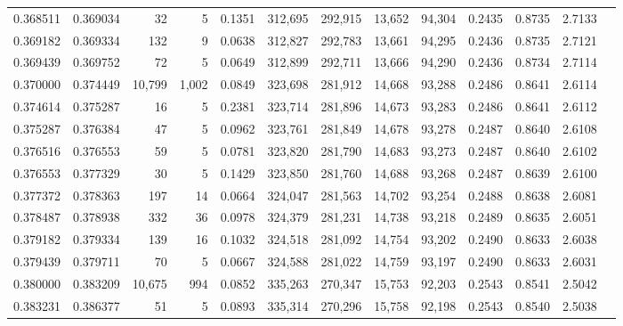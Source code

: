 \begin{tabular}{rrrrrrrrrrrrr}
0.368511 & 0.369034 &     32 &     5 &                                     0.1351 & 312,695 & 292,915 &  13,652 &  94,304 & 0.2435 & 0.8735 & 2.7133 \\
0.369182 & 0.369334 &    132 &     9 &                                     0.0638 & 312,827 & 292,783 &  13,661 &  94,295 & 0.2436 & 0.8735 & 2.7121 \\
0.369439 & 0.369752 &     72 &     5 &                                     0.0649 & 312,899 & 292,711 &  13,666 &  94,290 & 0.2436 & 0.8734 & 2.7114 \\
0.370000 & 0.374449 & 10,799 & 1,002 &                                     0.0849 & 323,698 & 281,912 &  14,668 &  93,288 & 0.2486 & 0.8641 & 2.6114 \\
0.374614 & 0.375287 &     16 &     5 &                                     0.2381 & 323,714 & 281,896 &  14,673 &  93,283 & 0.2486 & 0.8641 & 2.6112 \\
0.375287 & 0.376384 &     47 &     5 &                                     0.0962 & 323,761 & 281,849 &  14,678 &  93,278 & 0.2487 & 0.8640 & 2.6108 \\
0.376516 & 0.376553 &     59 &     5 &                                     0.0781 & 323,820 & 281,790 &  14,683 &  93,273 & 0.2487 & 0.8640 & 2.6102 \\
0.376553 & 0.377329 &     30 &     5 &                                     0.1429 & 323,850 & 281,760 &  14,688 &  93,268 & 0.2487 & 0.8639 & 2.6100 \\
0.377372 & 0.378363 &    197 &    14 &                                     0.0664 & 324,047 & 281,563 &  14,702 &  93,254 & 0.2488 & 0.8638 & 2.6081 \\
0.378487 & 0.378938 &    332 &    36 &                                     0.0978 & 324,379 & 281,231 &  14,738 &  93,218 & 0.2489 & 0.8635 & 2.6051 \\
0.379182 & 0.379334 &    139 &    16 &                                     0.1032 & 324,518 & 281,092 &  14,754 &  93,202 & 0.2490 & 0.8633 & 2.6038 \\
0.379439 & 0.379711 &     70 &     5 &                                     0.0667 & 324,588 & 281,022 &  14,759 &  93,197 & 0.2490 & 0.8633 & 2.6031 \\
0.380000 & 0.383209 & 10,675 &   994 &                                     0.0852 & 335,263 & 270,347 &  15,753 &  92,203 & 0.2543 & 0.8541 & 2.5042 \\
0.383231 & 0.386377 &     51 &     5 &                                     0.0893 & 335,314 & 270,296 &  15,758 &  92,198 & 0.2543 & 0.8540 & 2.5038 \\

\end{tabular}
